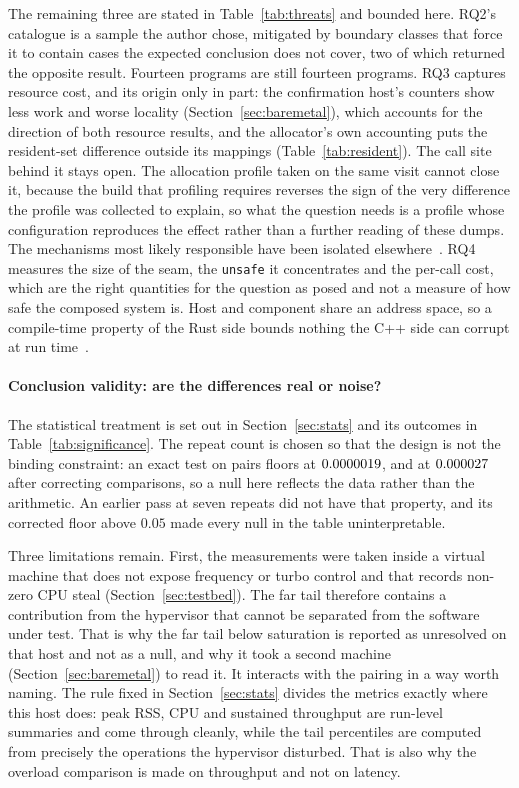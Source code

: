 \documentclass[english,oneside,a4paper,censored,csm,software-track-2020]{HYthesisML}
\begin{document}
The remaining three are stated in Table~\ref{tab:threats} and bounded here. RQ2's catalogue is a
sample the author chose, mitigated by boundary classes that force it to contain cases the expected
conclusion does not cover, two of which returned the opposite result. Fourteen programs are still
fourteen programs. RQ3 captures resource cost, and its origin only in part: the confirmation host's
counters show less work and worse locality (Section~\ref{sec:baremetal}), which accounts for the
direction of both resource results, and the allocator's own accounting puts the resident-set
difference outside its mappings (Table~\ref{tab:resident}). The call site behind it stays open. The
allocation profile taken on the same visit cannot close it, because the build that profiling
requires reverses the sign of the very difference the profile was collected to explain, so what
the question needs is a profile whose configuration reproduces the effect rather than a further
reading of these dumps. The mechanisms most likely responsible have been isolated
elsewhere~\cite{zhang2022runtime,harris2023morello}. RQ4 measures the size of the seam,
the \texttt{unsafe} it concentrates and the per-call cost, which are the right quantities for the
question as posed and not a measure of how safe the composed system is. Host and component share
an address space, so a compile-time property of the Rust side bounds nothing the C++ side can
corrupt at run time~\cite{rivera2021galeed,kirth2022pkrusafe}.

\paragraph{Conclusion validity: are the differences real or noise?}
The statistical treatment is set out in Section~\ref{sec:stats} and its outcomes in
Table~\ref{tab:significance}. The repeat count is chosen so that the design is not the binding
constraint: an exact test on \NRepeats{} pairs floors at $0.0000019$, and at
$0.000027$ after correcting \NTests{} comparisons, so a null here reflects the data rather
than the arithmetic. An earlier pass at seven repeats did not have that property, and its
corrected floor above $0.05$ made every null in the table uninterpretable.

Three limitations remain. First, the measurements were taken inside a virtual machine that does
not expose frequency or turbo control and that records non-zero CPU steal
(Section~\ref{sec:testbed}). The far tail therefore contains a contribution from the hypervisor
that cannot be separated from the software under test. That is why the far tail below saturation is
reported as unresolved on that host and not as a null, and why it took a second machine
(Section~\ref{sec:baremetal}) to read it. It interacts with the pairing in a way worth naming.
The rule fixed in Section~\ref{sec:stats} divides the metrics exactly where this host does: peak
RSS, CPU and sustained throughput are run-level summaries and come through cleanly, while the
tail percentiles are computed from precisely the operations the hypervisor disturbed. That is
also why the overload comparison is made on throughput and not on latency.
\end{document}
